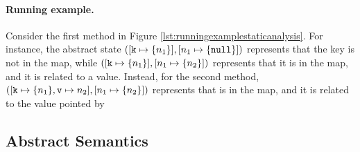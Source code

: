 \paragraph{Running example.} 
Consider the first method in Figure \ref{lst:runningexamplestaticanalysis}. For instance, the abstract state $([\mathtt{k} \mapsto \{n_1\}], [n_1 \mapsto \{\mathtt{null}\}])$ represents that the key  is not in the map, while $([\mathtt{k} \mapsto \{n_1\}], [n_1 \mapsto \{n_2\}])$ represents that it is in the map, and it is related to a value. Instead, for the second method, $([\mathtt{k} \mapsto \{n_1\}, \mathtt{v} \mapsto n_2], [n_1 \mapsto \{n_2\}])$ represents that  is in the map, and it is related to the value pointed by 


\subsection{Abstract Semantics}
\label{sect:abstractsemantics}

